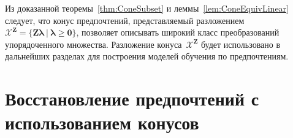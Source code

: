 \documentclass{elsarticle}
\newcommand{\bZ}{\mathbf{Z}}
\newcommand{\blambda}{\boldsymbol{\lambda}}
\newcommand{\cX}{\mathcal{X}}
\begin{document}
Из доказанной теоремы~\ref{thm:ConeSubset} и леммы~\ref{lem:ConeEquivLinear} следует, что конус предпочтений, представляемый разложением~$\cX^{\bZ}=\{\bZ\blambda~|~\blambda \geq \mathbf{0}\}$, позволяет описывать широкий класс преобразований упорядоченного множества. Разложение конуса~$\cX^{\bZ}$ будет использовано в дальнейших разделах для построения моделей обучения по предпочтениям.


\section{Восстановление предпочтений с использованием конусов}\label{sec:PrefLearnCones}


\end{document}
